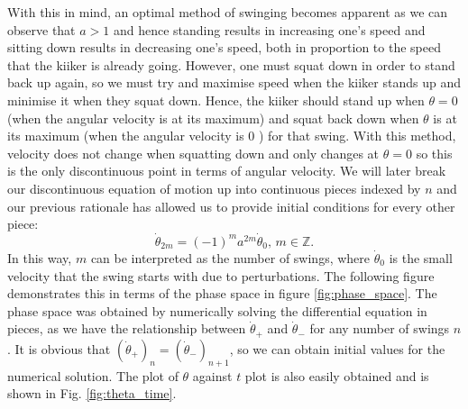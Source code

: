\documentclass[12pt]{article}
\begin{document}
With this in mind, an optimal method of swinging becomes apparent as we can observe that $a >1$ and hence standing results in increasing one's speed and sitting down results in decreasing one's speed, both in proportion to the speed that the kiiker is already going. However, one must squat down in order to stand back up again, so we must try and maximise speed when the kiiker stands up and minimise it when they squat down. Hence, the kiiker should stand up when $\theta = 0$ (when the angular velocity is at its maximum) and squat back down when $\theta$ is at its maximum (when the angular velocity is 0 ) for that swing. With this method, velocity does not change when squatting down and only changes at $\theta = 0$ so this is the only discontinuous point in terms of angular velocity. We will later break our discontinuous equation of motion up into continuous pieces indexed by $n$ and our previous rationale has allowed us to provide initial conditions for every other piece:
\begin{equation}
    \dot{\theta}_{2m} = (-1)^ma^{2m}\dot{\theta}_0, \, m \in \mathbb{Z}.
\end{equation}
In this way, $m$ can be interpreted as the number of swings, where $\dot{\theta}_0$ is the small velocity that the swing starts with due to perturbations. The following figure demonstrates this in terms of the phase space in figure \ref{fig:phase_space}. The phase space was obtained by numerically solving the differential equation in pieces, as we have the relationship between $\dot\theta_{+}$ and $\dot\theta_{-}$ for any number of swings $n$. It is obvious that $(\dot\theta_{+})_n = (\dot\theta_-)_{n+1}$, so we can obtain initial values for the numerical solution. The plot of $\theta$ against $t$ plot is also easily obtained and is shown in Fig. \ref{fig:theta_time}.
\end{document}
